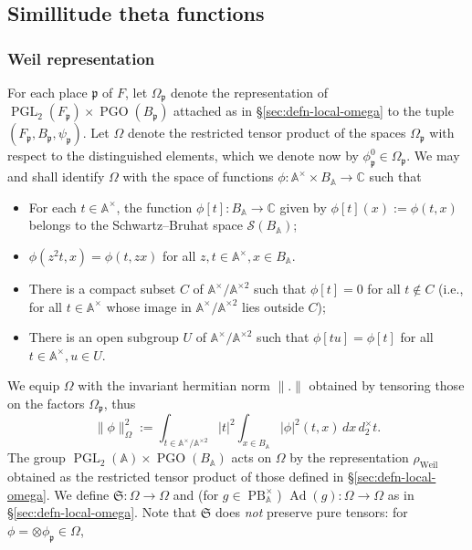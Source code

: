 \documentclass[reqno,10pt]{amsart}
\theoremstyle{plain} %
\theoremstyle{definition}
\theoremstyle{plain} %
\theoremstyle{remark}
\theoremstyle{itplain} %
\theoremstyle{remark} %
\numberwithin{equation}{section}
\DeclareMathOperator{\PGO}{PGO}
\DeclareMathOperator{\Ad}{Ad}
\def\PB{\operatorname{PB}}
\def\PGL{\operatorname{PGL}}
\DeclareMathOperator{\Weil}{Weil}
\begin{document}
\subsection{Simillitude theta functions\label{sec:non-traditional-theta-lifts}}
\label{sec-3-2-9}


\subsubsection{Weil representation\label{sec:similitudes-global}}
\label{sec-3-2-4}
For each place $\mathfrak{p}$ of $F$, let $\Omega_{\mathfrak{p}}$ denote the representation of $\PGL_2(F_{\mathfrak{p}}) \times \PGO(B_\mathfrak{p})$ attached as in \S\ref{sec:defn-local-omega} to the tuple $(F_\mathfrak{p},B_{\mathfrak{p}},\psi_{\mathfrak{p}})$.  Let $\Omega$ denote the restricted tensor product of the spaces $\Omega_{\mathfrak{p}}$ with respect to the distinguished elements, which we denote now by $\phi_{\mathfrak{p}}^0 \in \Omega_{\mathfrak{p}}$.  We may and shall identify $\Omega$ with the space of functions $\phi : \mathbb{A}^\times \times B_\mathbb{A} \rightarrow \mathbb{C}$ such that
\begin{itemize}
\item For each $t \in \mathbb{A}^\times$, the function $\phi[t] : B_\mathbb{A} \rightarrow \mathbb{C}$ given by $\phi[t](x) := \phi(t,x)$ belongs to the Schwartz--Bruhat space $\mathcal{S}(B_\mathbb{A})$;
\item $\phi(z^2 t, x) = \phi(t, z x)$ for all $z,t \in \mathbb{A}^\times, x \in B_\mathbb{A}$.
\item There is a compact subset $C$ of $\mathbb{A}^\times / \mathbb{A}^{\times 2}$ such that $\phi[t] = 0$ for all $t \notin C$ (i.e., for all $t \in \mathbb{A}^\times$ whose image in $\mathbb{A}^\times / \mathbb{A}^{\times 2}$ lies outside $C$);
\item There is an open subgroup $U$ of $\mathbb{A}^\times / \mathbb{A}^{\times 2}$ such that $\phi[t u] = \phi[t]$ for all $t \in \mathbb{A}^\times, u \in U$.
\end{itemize}
We equip $\Omega$ with the invariant hermitian norm $\|.\|$ obtained by tensoring those on the factors $\Omega_\mathfrak{p}$, thus
\begin{equation}\label{eqn:inner-product-on-Omega-1-adelic}
  \|\phi\|^2_{\Omega}
  :=
  \int_{t \in \mathbb{A}^\times / \mathbb{A}^{\times 2}}
  |t|^2
  \int_{x \in B_\mathbb{A}}
  |\phi|^2(t,x) \, d x \, d_2^\times t.
\end{equation}
The group $\PGL_2(\mathbb{A}) \times \PGO(B_\mathbb{A})$ acts on $\Omega$ by the representation $\rho_{\Weil}$ obtained as the restricted tensor product of those defined in \S\ref{sec:defn-local-omega}.  We define $\mathfrak{S} : \Omega \rightarrow \Omega$ and (for $g \in \PB^\times_\mathbb{A}$) $\Ad(g) : \Omega \rightarrow \Omega$ as in \S\ref{sec:defn-local-omega}.  Note that $\mathfrak{S}$ does \emph{not} preserve pure tensors: for $\phi = \otimes \phi_\mathfrak{p} \in \Omega$,
\end{document}
